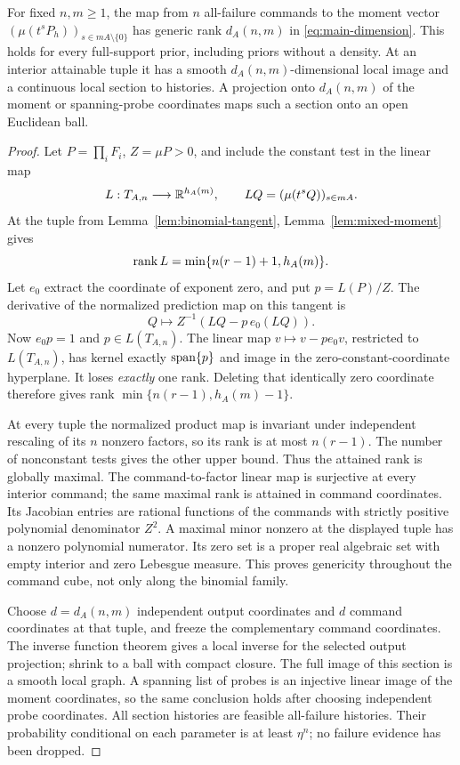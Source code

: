 \begin{theorem}\label{thm:rank}
For fixed $n,m\ge1$, the map from $n$ all-failure commands to the moment
vector $(\mu(t^sP_h))_{s\in mA\setminus\{0\}}$ has generic rank
$d_A(n,m)$ in \eqref{eq:main-dimension}. This holds for every full-support
prior, including priors without a density. At an interior attainable tuple
it has a smooth $d_A(n,m)$-dimensional local image and a continuous local
section to histories. A projection onto $d_A(n,m)$ of the moment or
spanning-probe coordinates maps such a section onto an open Euclidean ball.
\end{theorem}
\begin{proof}
Let $P=\prod_iF_i$, $Z=\mu P>0$, and include the constant test in the
linear map
\[
 L:T_{A,n}\longrightarrow\mathbb R^{h_A(m)},\qquad
 LQ=(\mu(t^sQ))_{s\in mA}.
\]
At the tuple from Lemma~\ref{lem:binomial-tangent},
Lemma~\ref{lem:mixed-moment} gives
\[
 \operatorname{rank} L=\min\{n(r-1)+1,h_A(m)\}.
\]
Let $e_0$ extract the coordinate of exponent zero, and put $p=L(P)/Z$.
The derivative of the normalized prediction map on this tangent is
\begin{equation}\label{eq:normalized-derivative}
 Q\longmapsto Z^{-1}(LQ-p\,e_0(LQ)).
\end{equation}
Now $e_0p=1$ and $p\in L(T_{A,n})$. The linear map
$v\mapsto v-p e_0v$, restricted to $L(T_{A,n})$, has kernel exactly
$\operatorname{span}\{p\}$ and image in the zero-constant-coordinate hyperplane.
It loses \emph{exactly} one rank. Deleting that identically zero coordinate
therefore gives rank $\min\{n(r-1),h_A(m)-1\}$.

At every tuple the normalized product map is invariant under independent
rescaling of its $n$ nonzero factors, so its rank is at most $n(r-1)$.
The number of nonconstant tests gives the other upper bound. Thus the
attained rank is globally maximal. The command-to-factor linear map is
surjective at every interior command; the same maximal rank is attained
in command coordinates. Its Jacobian entries are rational functions of
the commands with strictly positive polynomial denominator $Z^2$.
A maximal minor nonzero at the displayed tuple has a nonzero polynomial
numerator. Its zero set is a proper real algebraic set with empty interior
and zero Lebesgue measure. This proves genericity throughout the command
cube, not only along the binomial family.

Choose $d=d_A(n,m)$ independent output coordinates and $d$ command
coordinates at that tuple, and freeze the complementary command
coordinates. The inverse function theorem gives a local inverse for the
selected output projection; shrink to a ball with compact closure.
The full image of this section is a smooth local graph. A spanning list
of probes is an injective linear image of the moment coordinates, so the
same conclusion holds after choosing independent probe coordinates.
All section histories are feasible all-failure histories. Their probability
conditional on each parameter is at least $\eta^n$; no failure evidence
has been dropped.
\end{proof}

